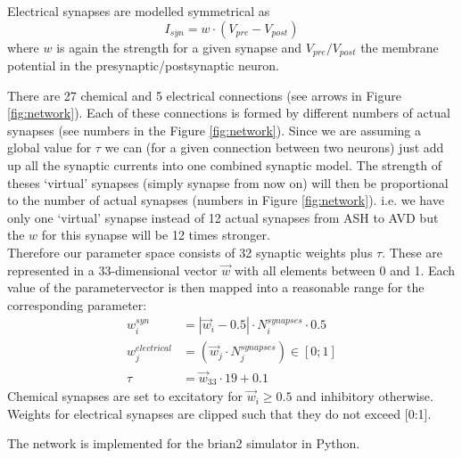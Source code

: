 Electrical synapses are modelled symmetrical as 
\[I_{syn} = w \cdot(V_{pre} - V_{post})\]
where $w$ is again the strength for a given synapse and $V_{pre}/V_{post}$ the membrane potential in the presynaptic/postsynaptic neuron. 

There are 27 chemical and 5 electrical connections (see arrows in Figure \ref{fig:network}). Each of these connections is formed by different numbers of actual synapses (see numbers in the Figure \ref{fig:network}). Since we are assuming a global value for $\tau$ we can (for a given connection between two neurons) just add up all the synaptic currents into one combined synaptic model. The strength of theses `virtual' synapses (simply synapse from now on) will then be proportional to the number of actual synapses (numbers in Figure \ref{fig:network}). i.e. we have only one `virtual' synapse instead of 12 actual synapses from ASH to AVD but the $w$ for this synapse will be 12 times stronger. \\
Therefore our parameter space consists of 32 synaptic weights plus $\tau$. These are represented in a 33-dimensional vector $\vec{w}$ with all elements between 0 and 1. Each value of the parametervector is then mapped into a reasonable range for the corresponding  parameter:
\begin{align*}
	w^{syn}_i &= | \vec{w}_i - 0.5 |  \cdot N^{synapses}_i \cdot 0.5\\ 
	w^{electrical}_j &= (\vec{w}_j \cdot N^{synapses}_j) \in [0;1] \\
	\tau &= \vec{w}_{33} \cdot 19 + 0.1 
\end{align*}
Chemical synapses are set to excitatory for $\vec{w}_i \geq 0.5$ and inhibitory otherwise. Weights for electrical synapses are clipped such that they do not exceed [0:1]. 

The network is implemented for the brian2 simulator in Python.


